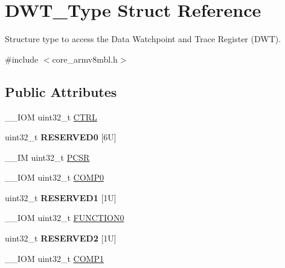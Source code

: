 \hypertarget{struct_d_w_t___type}{}\section{D\+W\+T\+\_\+\+Type Struct Reference}
\label{struct_d_w_t___type}


Structure type to access the Data Watchpoint and Trace Register (D\+WT).  




{\ttfamily \#include $<$core\+\_\+armv8mbl.\+h$>$}

\subsection*{Public Attributes}
\begin{DoxyCompactItemize}
\item 
\+\_\+\+\_\+\+I\+OM uint32\+\_\+t \mbox{\hyperlink{struct_d_w_t___type_add790c53410023b3b581919bb681fe2a}{C\+T\+RL}}
\item 
\mbox{\label{struct_d_w_t___type_a383c3272908da383b6e23a059007f728}} 
uint32\+\_\+t {\bfseries R\+E\+S\+E\+R\+V\+E\+D0} \mbox{[}6\+U\mbox{]}
\item 
\+\_\+\+\_\+\+IM uint32\+\_\+t \mbox{\hyperlink{struct_d_w_t___type_a6353ca1d1ad9bc1be05d3b5632960113}{P\+C\+SR}}
\item 
\+\_\+\+\_\+\+I\+OM uint32\+\_\+t \mbox{\hyperlink{struct_d_w_t___type_a61c2965af5bc0643f9af65620b0e67c9}{C\+O\+M\+P0}}
\item 
\mbox{\label{struct_d_w_t___type_af4ad5239d7d9b1990005f75464754594}} 
uint32\+\_\+t {\bfseries R\+E\+S\+E\+R\+V\+E\+D1} \mbox{[}1\+U\mbox{]}
\item 
\+\_\+\+\_\+\+I\+OM uint32\+\_\+t \mbox{\hyperlink{struct_d_w_t___type_a579ae082f58a0317b7ef029b20f52889}{F\+U\+N\+C\+T\+I\+O\+N0}}
\item 
\mbox{\label{struct_d_w_t___type_a61fdbdfbc267bb6ae3b5cff18f406f2f}} 
uint32\+\_\+t {\bfseries R\+E\+S\+E\+R\+V\+E\+D2} \mbox{[}1\+U\mbox{]}
\item 
\+\_\+\+\_\+\+I\+OM uint32\+\_\+t \mbox{\hyperlink{struct_d_w_t___type_a38714af6b7fa7c64d68f5e1efbe7a931}{C\+O\+M\+P1}}
\item 
\mbox{\label{struct_d_w_t___type_a7d29e03e23883440d96cac784c5a4958}} 

\end{DoxyCompactItemize}
